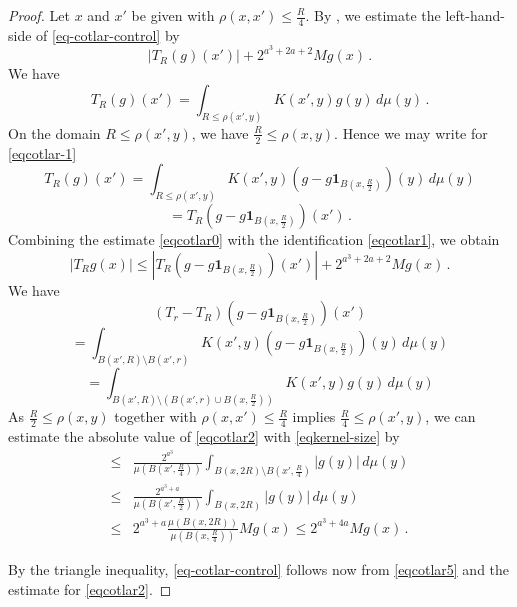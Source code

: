 \begin{proof}
\leanok
Let $x$ and $x'$ be given with $\rho(x,x')\le\frac {R}{4}$.
By , we estimate
the left-hand-side of
\eqref{eq-cotlar-control} by
\begin{equation}\label{eqcotlar0}
|T_R(g)(x')|+
2^{a^3 + 2a + 2} Mg(x)\,.
\end{equation}
We  have
\begin{equation}
\label{eqcotlar-1}
T_R(g)(x')=
\int_{R\le\rho(x',y)} K(x',y) g(y) \, d\mu(y)\, .
\end{equation}
On the domain $R\le\rho(x',y)$, we have $\frac {R}2\le\rho(x,y)$. Hence we may write
for \eqref{eqcotlar-1}
\begin{equation*}
T_R(g)(x')=\int_{R\le\rho(x',y)} K(x',y) (g-g\mathbf{1}_{B(x,\frac {R} 2)})(y) \,d\mu(y)
\end{equation*}
\begin{equation}\label{eqcotlar1}
=T_R(g-g\mathbf{1}_{B(x,\frac {R} 2)})(x')\, .
\end{equation}
Combining the estimate \eqref{eqcotlar0} with the identification \eqref{eqcotlar1}, we obtain
\begin{equation}\label{eqcotlar5}
\left|T_R g(x)
\right|\le
|T_R(g-g\mathbf{1}_{B(x,\frac {R} 2)})(x')|+
2^{a^3 + 2a + 2} Mg(x)\, .
\end{equation}
We  have
\begin{equation*}
(T_r-T_R)(g-g\mathbf{1}_{B(x,\frac {R} 2)})(x')
\end{equation*}
\begin{equation*}
= \int_{B(x',R)\setminus B(x',r)} K(x',y) (g-g\mathbf{1}_{B(x,\frac {R} 2)})(y) \,d\mu(y)
\end{equation*}
\begin{equation}\label{eqcotlar2}
= \int_{B(x',R)\setminus (B(x',r) \cup B(x,\frac{R}{2}))} K(x',y) g(y) \,d\mu(y)
\end{equation}
As $\frac{R}{2}\le\rho(x,y)$ together with $\rho(x,x')\le\frac {R}{4}$ implies
$\frac {R}{4}\le\rho(x',y)$, we can estimate the absolute value of \eqref{eqcotlar2} with \eqref{eqkernel-size} by
\begin{align*}
\le &\frac{2^{a^3}}{\mu(B(x',\frac{R}{4}))} \int_{B(x,2R)\setminus B(x',\frac{R}{4})}
|g(y)|\, d\mu(y) \\
\le &\frac{2^{a^3+a}}{\mu(B(x',\frac{R}{2}))} \int_{B(x,2R)}
|g(y)|\, d\mu(y) \\
\le &2^{a^3+a} \frac{\mu(B(x,2R))}{\mu(B(x,\frac{R}{4}))} Mg(x) \le 2^{a^3 + 4a} Mg(x)\, .
\end{align*}

By the triangle inequality, \eqref{eq-cotlar-control} follows now from \eqref{eqcotlar5} and the estimate for \eqref{eqcotlar2}.
\end{proof}

